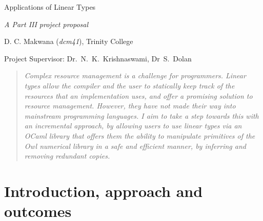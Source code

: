 \documentclass[11pt]{article}
\newcommand{\guidance}[1]{\textsl{\textcolor{Gray}{#1}}}
\begin{document}
\centerline{\Large Applications of Linear Types}
\vspace{2em}
\centerline{\Large \emph{A Part III project proposal}}
\vspace{2em}
\centerline{\large D. C. Makwana (\emph{dcm41}), Trinity College}
\vspace{1em}
\centerline{\large Project Supervisor: Dr.~N.~K.~Krishnaswami, Dr~S.~Dolan}
\vspace{1em}

\begin{abstract}
\textsl{%
    Complex resource management is a challenge for programmers.  Linear types
    allow the compiler and the user to statically keep track of the resources
    that an implementation uses, and offer a promising solution to
    resource management. However, they have not made their way into mainstream
    programming languages. I aim to take a step towards this with an
    incremental approach, by allowing users to use linear types via an OCaml
    library that offers them the ability to manipulate primitives of the Owl
    numerical library in a safe and efficient manner, by inferring and removing
    redundant copies.
}%

\end{abstract}

\section{Introduction, approach and outcomes}


\end{document}
